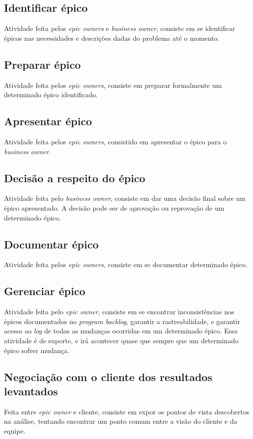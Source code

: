 \subsection{Identificar épico}
Atividade feita pelos \emph{epic owners} e \emph{business owner}, consiste em se identificar épicos nas necessidades e descrições dadas do problema até o momento.

\subsection{Preparar épico}
Atividade feita pelos \emph{epic owners}, consiste em preparar formalmente um determinado épico identificado.

\subsection{Apresentar épico}
Atividade feita pelos \emph{epic owners}, consistido em apresentar o épico para o \emph{business owner}.

\subsection{Decisão a respeito do épico}
Atividade feita pelo \emph{business owner}, consiste em dar uma decisão final sobre um épico apresentado. A decisão pode ser de aprovação ou reprovação de um determinado épico.

\subsection{Documentar épico}
Atividade feita pelos \emph{epic owners}, consiste em se documentar determinado épico.

\subsection{Gerenciar épico}
Atividade feita pelo \emph{epic owner}, consiste em se encontrar inconsistências nos épicos documentados no \emph{program backlog}, garantir a rastreabilidade, e garantir acesso ao \emph{log} de todas as mudanças ocorridas em um determinado épico. Essa atividade é de suporte, e irá acontecer quase que sempre que um determinado épico sofrer mudança.

\subsection{Negociação com o cliente dos resultados levantados}
Feita entre \emph{epic owner} e cliente, consiste em expor os pontos de vista descobertos na análise, tentando encontrar um ponto comum entre a visão do cliente e da equipe.

